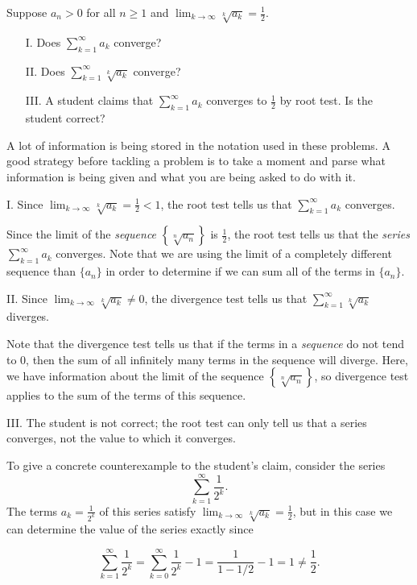 \documentclass[noauthor,handout]{ximera}
\begin{document}
\begin{problem}
Suppose $a_n>0$ for all $n \geq 1$ and $\lim_{k \rightarrow \infty}\sqrt[k]{a_k} = \frac{1}{2}.$

\begin{itemize}
\item[I.] Does $\sum_{k=1}^\infty a_k$ converge?
\item[II.] Does $\sum_{k=1}^\infty\sqrt[k]{a_k}$ converge?
\item[III.] A student claims that $\sum_{k=1}^\infty a_k$ converges to $\frac{1}{2}$ by root test. Is the student correct?
\end{itemize}

\begin{freeResponse}
A lot of information is being stored in the notation used in these problems.  A good strategy before tackling a problem is to take a moment and parse what information is being given and what you are being asked to do with it.

I. Since $\lim_{k \rightarrow \infty}\sqrt[k]{a_k} = \frac{1}{2}<1$, the root test tells us that $\sum_{k=1}^\infty a_k$ converges.

\begin{remark}
Since the limit of the \emph{sequence} $\left\{\sqrt[n]{a_n} \right\}$ is $\frac{1}{2}$, the root test tells us that the \emph{series} $\sum_{k=1}^\infty a_k$ converges.  Note that we are using the limit of a completely different sequence than $\{a_n\}$ in order to determine if we can sum all of the terms in $\{a_n\}$.
\end{remark}


II. Since $\lim_{k \rightarrow \infty}\sqrt[k]{a_k} \neq 0$, the divergence test tells us that $\sum_{k=1}^\infty\sqrt[k]{a_k}$ diverges.


\begin{remark}
Note that the divergence test tells us that if the terms in a \emph{sequence} do not tend to $0$, then the sum of all infinitely many terms in the sequence will diverge.  Here, we have information about the limit of the sequence $\left\{\sqrt[n]{a_n} \right\}$, so divergence test applies to the sum of the terms of this sequence.
\end{remark}

III. The student is not correct; the root test can only tell us that a series converges, not the value to which it converges. 

To give a concrete counterexample to the student's claim, consider the series 
$$
\sum_{k=1}^\infty \frac{1}{2^k}.
$$
The terms $a_k = \frac{1}{2^k}$ of this series satisfy $\lim_{k \rightarrow \infty}\sqrt[k]{a_k} = \frac{1}{2}$, but in this case we can determine the value of the series exactly since

$$
\sum_{k=1}^\infty \frac{1}{2^k} = \sum_{k=0}^\infty \frac{1}{2^k} - 1 = \frac{1}{1-1/2} - 1 = 1 \neq \frac{1}{2}.
$$


\end{freeResponse}
\end{problem}
\end{document}

